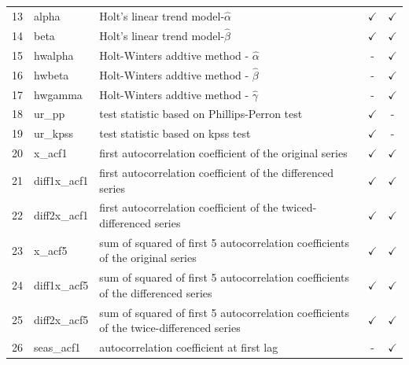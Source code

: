 \documentclass[11pt,a4paper,]{article}
\theoremstyle{definition}
\theoremstyle{definition}
\theoremstyle{definition}
\theoremstyle{remark}
\begin{document}
\begin{table}[!p]
\begin{tabular}{llp{7.5cm}cc}
13 & alpha          & Holt's linear trend model-$\hat\alpha$                                                           & $\checkmark$  & $\checkmark$ \\
14 & beta           & Holt's linear trend model-$\hat\beta$                                                            & $\checkmark$  & $\checkmark$\\
15 & hwalpha        & Holt-Winters addtive method - $\hat\alpha$                                                       & -             & $\checkmark$ \\
16 & hwbeta         & Holt-Winters addtive method - $\hat\beta$                                                        & -             & $\checkmark$ \\
17 & hwgamma        & Holt-Winters addtive method - $\hat\gamma$                                                       & -             & $\checkmark$ \\
18 & ur\_pp         & test statistic based on Phillips-Perron test                                                     & $\checkmark$  & - \\
19 & ur\_kpss       & test statistic based on kpss test                                                                & $\checkmark$  & - \\
20 & x\_acf1        & first autocorrelation coefficient of the original series                                        & $\checkmark$  & $\checkmark$ \\
21 & diff1x\_acf1   & first autocorrelation coefficient of the differenced series                                      & $\checkmark$  & $\checkmark$ \\
22 & diff2x\_acf1   & first autocorrelation coefficient of the twiced-differenced series                               & $\checkmark$  & $\checkmark$ \\
23 & x\_acf5        & sum of squared of first 5 autocorrelation coefficients of the original series                    & $\checkmark$  & $\checkmark$ \\
24 & diff1x\_acf5   & sum of squared of first 5 autocorrelation coefficients of the differenced series                 & $\checkmark$  & $\checkmark$ \\
25 & diff2x\_acf5   & sum of squared of first 5 autocorrelation coefficients of the twice-differenced series           & $\checkmark$  & $\checkmark$ \\
26 & seas\_acf1     & autocorrelation coefficient at first lag                                                         & -             & $\checkmark$ \\

\end{tabular}
\end{table}
\end{document}
